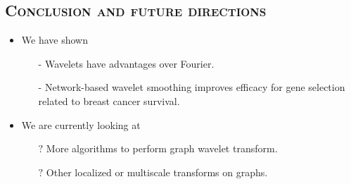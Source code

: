 \documentclass[xcolor=x11names,compress]{beamer}
\theoremstyle{plain}
\renewcommand{\(}{\begin{columns}}
\renewcommand{\)}{\end{columns}}
\newcommand{\<}[1]{\begin{column}{#1}}
\renewcommand{\>}{\end{column}}
\begin{document}
\subsection{\scshape Conclusion and future directions}
\begin{frame}{\insertsubsection}
	
	\begin{itemize}
		\item We have shown
		\begin{itemize}
			\item[-] Wavelets have advantages over Fourier.
			\item[-] Network-based wavelet smoothing improves efficacy for gene selection related to breast cancer survival.
		\end{itemize}
		
		\pause
		
		\item We are currently looking at
		\begin{itemize}
			\item[$?$] More algorithms to perform graph wavelet transform.
			\item[$?$] Other localized or multiscale transforms on graphs.
		\end{itemize}
	\end{itemize}
	
\end{frame}
\end{document}

